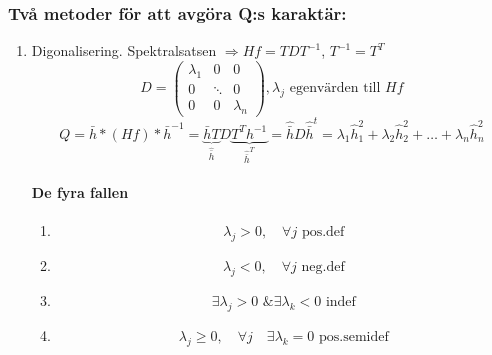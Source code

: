 \documentclass[a4paper]{article}
\begin{document}
\subsubsection{Två metoder för att avgöra Q:s karaktär:}
\begin{enumerate}
\item Digonalisering. Spektralsatsen $\Rightarrow Hf = TDT^{-1}$, $T^{-1} = T^T$
$$
	D =
	\begin{pmatrix}
		\lambda_1 & 0 & 0 \\
		0 & \ddots & 0 \\
		0 & 0 & \lambda_n
	\end{pmatrix}
	, \lambda_j \text{ egenvärden till } Hf
$$
$$
	Q = \bar{h}*(Hf)*\bar{h}^{-1} = \underbrace{\bar{h}T}_{\hat{\bar{h}}}D\underbrace{T^Th^{-1}}_{\hat{\bar{h}}^T} = \hat{\bar{h}}D\hat{\bar{h}}^t = \lambda_1\hat{h}^2_1 + \lambda_2\hat{h}^2_2 + \ldots + \lambda_n\hat{h}^2_n
$$

\paragraph{De fyra fallen}
\begin{enumerate}
\item
$$ \lambda_j > 0, \quad \forall j \text{ pos.def} $$
\item
$$ \lambda_j < 0, \quad \forall j \text{ neg.def} $$
\item
$$ \exists\lambda_j > 0 \text{ \& } \exists\lambda_k < 0 \text{ indef} $$
\item
$$ \lambda_j \geq 0, \quad \forall j \quad\exists\lambda_k = 0 \text{ pos.semidef} $$
\end{enumerate}


\end{enumerate}
\end{document}

